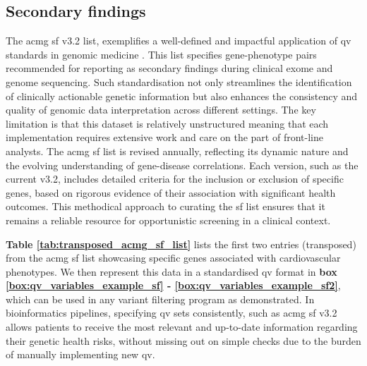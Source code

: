 \subsection{Secondary findings}
The \ac{acmg} \ac{sf} v3.2 list, exemplifies a well-defined and impactful application of \ac{qv} standards in genomic medicine 
\cite{miller2023acmg}. 
This list specifies gene-phenotype pairs recommended for reporting as secondary findings during clinical exome and genome sequencing. 
Such standardisation not only streamlines the identification of clinically actionable genetic information but also enhances the consistency and quality of genomic data interpretation across different settings.
The key limitation is that this dataset is relatively unstructured meaning that each implementation requires extensive work and care on the part of front-line analysts. 
The \ac{acmg} \ac{sf} list is revised annually, reflecting its dynamic nature and the evolving understanding of gene-disease correlations. 
Each version, such as the current v3.2, includes detailed criteria for the inclusion or exclusion of specific genes, based on rigorous evidence of their association with significant health outcomes. 
This methodical approach to curating the \ac{sf}  list ensures that it remains a reliable resource for opportunistic screening in a clinical context.

\textbf{Table \ref{tab:transposed_acmg_sf_list}} lists the first two entries (transposed) from the \ac{acmg} \ac{sf} list showcasing specific genes associated with cardiovascular phenotypes.
We then represent this data in a standardised \ac{qv} format in
\textbf{box
\ref{box:qv_variables_example_sf} - 
\ref{box:qv_variables_example_sf2}},
which can be used in any variant filtering program as demonstrated.
In bioinformatics pipelines, specifying \ac{qv} sets consistently, such as \ac{acmg} \ac{sf} v3.2 allows patients to receive the most relevant and up-to-date information regarding their genetic health risks, without missing out on simple checks due to the burden of manually implementing new \ac{qv}. 

